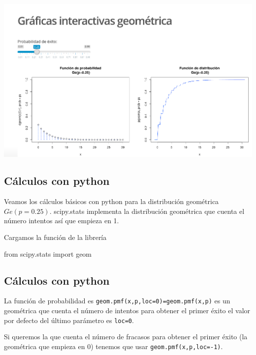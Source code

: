 \documentclass[]{book}
\newenvironment{Shaded}{\begin{snugshade}}{\end{snugshade}}
\newcommand{\ImportTok}[1]{#1}
\newcommand{\NormalTok}[1]{#1}
\begin{document}
\href{https://joanby.shinyapps.io/DistribucionesNotables/}{\includegraphics{Images/noshinyImages/interactiva_geometrica1.png}}

\hypertarget{cuxe1lculos-con-python}{%
\subsection{Cálculos con python}\label{cuxe1lculos-con-python}}

Veamos los cálculos básicos con python para la distribución geométrica \(Ge(p=0.25)\). scipy.stats implementa la distribución geométrica que cuenta el número intentos así que empieza en 1.

Cargamos la función de la librería

\begin{Shaded}
\begin{Highlighting}[]
\ImportTok{from}\NormalTok{ scipy.stats }\ImportTok{import}\NormalTok{ geom}
\end{Highlighting}
\end{Shaded}

\hypertarget{cuxe1lculos-con-python-1}{%
\subsection{Cálculos con python}\label{cuxe1lculos-con-python-1}}

La función de probabilidad es \texttt{geom.pmf(x,p,loc=0)=geom.pmf(x,p)} es un geométrica que cuenta el número de intentos para obtener el primer éxito el valor por defecto del último parámetro es \texttt{loc=0}.

Si queremos la que cuenta el número de fracasos para obtener el primer éxito (la geométrica que empieza en 0) tenemos que usar \texttt{geom.pmf(x,p,loc=-1)}.
\end{document}
